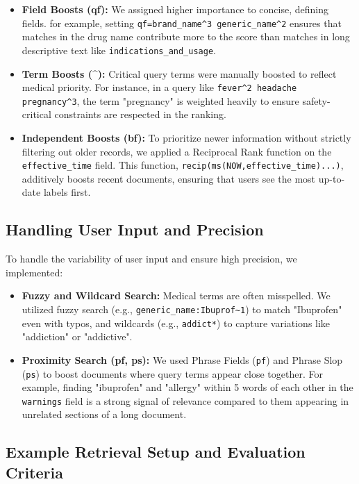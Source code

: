 \begin{itemize}
    \item \textbf{Field Boosts (qf):} We assigned higher importance to concise, defining fields. for example, setting \texttt{qf=brand\_name\^{}3 generic\_name\^{}2} ensures that matches in the drug name contribute more to the score than matches in long descriptive text like \texttt{indications\_and\_usage}.
    \item \textbf{Term Boosts (\textasciicircum{}):} Critical query terms were manually boosted to reflect medical priority. For instance, in a query like \texttt{fever\^{}2 headache pregnancy\^{}3}, the term "pregnancy" is weighted heavily to ensure safety-critical constraints are respected in the ranking.
    \item \textbf{Independent Boosts (bf):} To prioritize newer information without strictly filtering out older records, we applied a Reciprocal Rank function on the \texttt{effective\_time} field. This function, \texttt{recip(ms(NOW,effective\_time)...)}, additively boosts recent documents, ensuring that users see the most up-to-date labels first.
\end{itemize}

\subsection{Handling User Input and Precision}
To handle the variability of user input and ensure high precision, we implemented:

\begin{itemize}
    \item \textbf{Fuzzy and Wildcard Search:} Medical terms are often misspelled. We utilized fuzzy search (e.g., \texttt{generic\_name:Ibuprof\textasciitilde{}1}) to match "Ibuprofen" even with typos, and wildcards (e.g., \texttt{addict*}) to capture variations like "addiction" or "addictive".
    \item \textbf{Proximity Search (pf, ps):} We used Phrase Fields (\texttt{pf}) and Phrase Slop (\texttt{ps}) to boost documents where query terms appear close together. For example, finding "ibuprofen" and "allergy" within 5 words of each other in the \texttt{warnings} field is a strong signal of relevance compared to them appearing in unrelated sections of a long document.
\end{itemize}


\subsection{Example Retrieval Setup and Evaluation Criteria}
\label{sec:example-setup}

